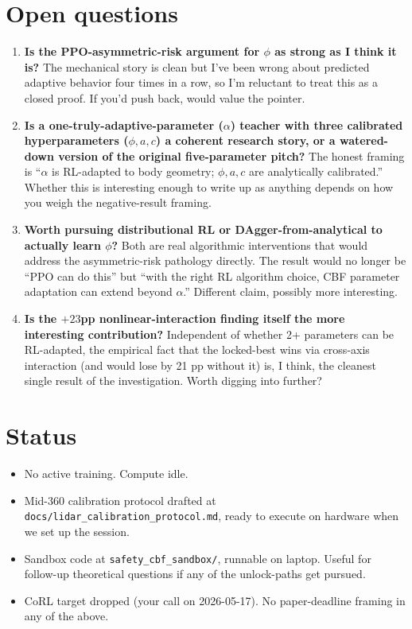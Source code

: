 \documentclass[11pt]{article}
\begin{document}
\section*{Open questions}

\begin{enumerate}
\item \textbf{Is the PPO-asymmetric-risk argument for $\phi$ as strong as I think it is?} The mechanical story is clean but I've been wrong about predicted adaptive behavior four times in a row, so I'm reluctant to treat this as a closed proof. If you'd push back, would value the pointer.

\item \textbf{Is a one-truly-adaptive-parameter ($\alpha$) teacher with three calibrated hyperparameters ($\phi, a, c$) a coherent research story, or a watered-down version of the original five-parameter pitch?} The honest framing is ``$\alpha$ is RL-adapted to body geometry; $\phi, a, c$ are analytically calibrated.'' Whether this is interesting enough to write up as anything depends on how you weigh the negative-result framing.

\item \textbf{Worth pursuing distributional RL or DAgger-from-analytical to actually learn $\phi$?} Both are real algorithmic interventions that would address the asymmetric-risk pathology directly. The result would no longer be ``PPO can do this'' but ``with the right RL algorithm choice, CBF parameter adaptation can extend beyond $\alpha$.'' Different claim, possibly more interesting.

\item \textbf{Is the $+23$pp nonlinear-interaction finding itself the more interesting contribution?} Independent of whether 2+ parameters can be RL-adapted, the empirical fact that the locked-best wins via cross-axis interaction (and would lose by 21 pp without it) is, I think, the cleanest single result of the investigation. Worth digging into further?
\end{enumerate}

\section*{Status}

\begin{itemize}
\item No active training. Compute idle.
\item Mid-360 calibration protocol drafted at \texttt{docs/lidar\_calibration\_protocol.md}, ready to execute on hardware when we set up the session.
\item Sandbox code at \texttt{safety\_cbf\_sandbox/}, runnable on laptop. Useful for follow-up theoretical questions if any of the unlock-paths get pursued.
\item CoRL target dropped (your call on 2026-05-17). No paper-deadline framing in any of the above.
\end{itemize}
\end{document}
